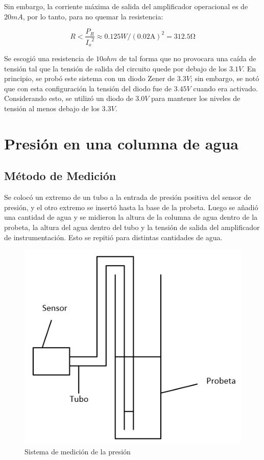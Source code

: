 Sin embargo, la corriente máxima de salida del amplificador operacional es de $20 mA$, por lo tanto, para no quemar la resistencia:

\begin{equation*}
R<\frac{P_R}{{I_o}^2}\approx 0.125 W/{(0.02\si{\ampere})}^2=312.5 \si{\ohm}
\end{equation*}

Se escogió una resistencia de $10\si{ohm}$ de tal forma que no provocara una caída de tensión tal que la tensión de salida del circuito quede por debajo de los $3.1V$. En principio, se probó este sistema con un diodo Zener de $3.3 V$; sin embargo, se notó que con esta configuración la tensión del diodo fue de $3.45 V$ cuando era activado. Considerando esto, se utilizó un diodo de $3.0V$ para mantener los niveles de tensión al menos debajo de los $3.3V$.

\section{Presión en una columna de agua}
\subsection{Método de Medición}
Se colocó un extremo de un tubo a la entrada de presión positiva del sensor de presión, y el otro extremo se insertó hasta la base de la probeta. Luego se añadió una cantidad de agua y se midieron la altura de la columna de agua dentro de la probeta, la altura del agua dentro del tubo y la tensión de salida del amplificador de instrumentación. Esto se repitió para distintas cantidades de agua.

\begin{figure}[ht]
\begin{center}
\includegraphics[scale=0.5]{../Ex4/Informe//res/probeta.png}
\caption{Sistema de medición de la presión}
\end{center}
\end{figure}

